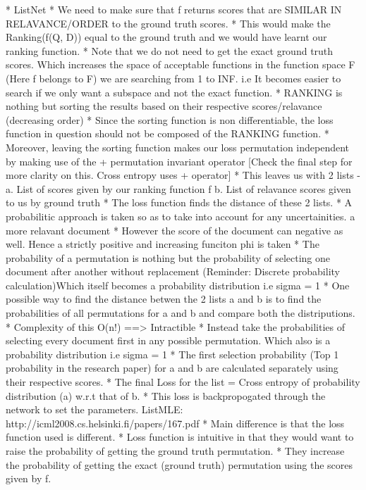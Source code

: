\documentclass[11pt]{report}
\begin{document}
    * ListNet
    * We need to make sure that f returns scores that are SIMILAR IN RELAVANCE/ORDER to the ground truth scores.
    * This would make the Ranking(f(Q, D)) equal to the ground truth and we would have learnt our ranking function.
    * Note that we do not need to get the exact ground truth scores. Which increases the space of acceptable functions in the
      function space F (Here f belongs to F) we are searching from 1 to INF. i.e It becomes easier to search if we only want a subspace and not the exact function.
    * RANKING is nothing but sorting the results based on their respective scores/relavance (decreasing order)
    * Since the sorting function is non differentiable, the loss function in question should not be composed of the RANKING function.
    * Moreover, leaving the sorting function makes our loss permutation independent by making use of the + permutation invariant operator
      [Check the final step for more clarity on this. Cross entropy uses + operator]
    * This leaves us with 2 lists -
        a. List of scores given by our ranking function f
        b. List of relavance scores given to us by ground truth
    * The loss function finds the distance of these 2 lists.
    * A probabilitic approach is taken so as to take into account for any uncertainities.
      a more relavant document
    * However the score of the document can negative as well. Hence a strictly positive and increasing funciton phi is taken
    * The probability of a permutation is nothing but the probability of selecting one document after another without replacement
      (Reminder: Discrete probability calculation){Which itself becomes a probability distribution i.e sigma = 1}
    * One possible way to find the distance betwen the 2 lists a and b is to find the probabilities of all permutations for a and b
      and compare both the distriputions. 
    * Complexity of this O(n!) ==> Intractible
    * Instead take the probabilities of selecting every document first in any possible permutation. {Which also is a probability 
      distribution i.e sigma = 1}
    * The first selection probability (Top 1 probability in the research paper) for a and b are calculated separately using their
      respective scores.
    * The final Loss for the list = Cross entropy of probability distribution (a) w.r.t that of b.
    * This loss is backpropogated through the network to set the parameters.
%
    ListMLE: http://icml2008.cs.helsinki.fi/papers/167.pdf
    * Main difference is that the loss function used is different.
    * Loss function is intuitive in that they would want to raise the probability of getting the ground truth permutation.
    * They increase the probability of getting the exact (ground truth) permutation using the scores given by f.
\end{document}
